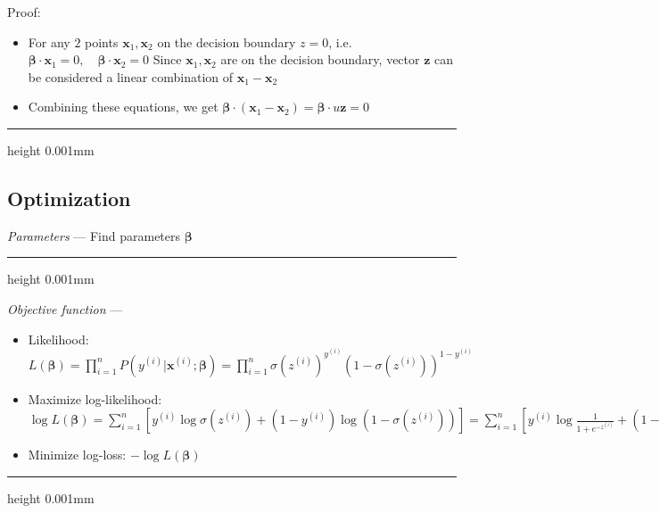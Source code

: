 \begin{itemize}
\begin{itemize}
        Proof:
        \begin{itemize}
            \item For any $2$ points $\boldsymbol{x}_1,\boldsymbol{x}_2$ on the decision boundary $z = 0$, i.e. $\boldsymbol{\beta} \cdot \boldsymbol{x}_1 =0, \quad \boldsymbol{\beta} \cdot \boldsymbol{x}_2 =0$ 
            \iem Since $\boldsymbol{x}_1,\boldsymbol{x}_2$ are on the decision boundary, vector $\boldsymbol{z}$ can be considered a linear combination of $\boldsymbol{x}_1 - \boldsymbol{x}_2$
            \item Combining these equations, we get $\boldsymbol{\beta} \cdot (\boldsymbol{x}_1 - \boldsymbol{x}_2) =\boldsymbol{\beta} \cdot u \boldsymbol{z}=0$
        \end{itemize}
    \end{itemize}
\end{itemize}

{\color{black}\hrule height 0.001mm}

\subsection*{Optimization}
\emph{Parameters} --- Find parameters $\boldsymbol{\beta}$

{\color{lightgray}\hrule height 0.001mm}

\emph{Objective function} --- 
\begin{itemize}
    \item Likelihood: $L(\boldsymbol{\beta}) = \prod_{i=1}^n P(y^{(i)} | \boldsymbol{x}^{(i)}; \boldsymbol{\beta}) = \prod_{i=1}^n \sigma(z^{(i)})^{y^{(i)}} (1 - \sigma(z^{(i)}))^{1 - y^{(i)}}$
    \item Maximize log-likelihood: 
    $\log L(\boldsymbol{\beta}) = \sum_{i=1}^n \left[ y^{(i)} \log \sigma(z^{(i)}) + (1 - y^{(i)}) \log (1 - \sigma(z^{(i)})) \right] = \sum_{i=1}^n \left[ y^{(i)} \log \frac{1}{1 + e^{-z^{(i)}}} + (1 - y^{(i)}) \log \frac{e^{-z^{(i)}}}{1 + e^{-z^{(i)}}} \right] = \sum_{i=1}^n \left[ y^{(i)} z^{(i)} - \log (1 + e^{z^{(i)}}) \right]$
    \item Minimize log-loss: $ -\log L(\boldsymbol{\beta})$
\end{itemize}

{\color{lightgray}\hrule height 0.001mm}

